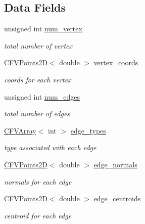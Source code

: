 \subsection*{Data Fields}
\begin{DoxyCompactItemize}
\item 
unsigned int \hyperlink{classFVL_1_1CFVMesh2D_a66b841fd6e58a9fc9b63df4fe982178f}{num\_\-vertex}
\begin{DoxyCompactList}\small\item\em total number of vertex \item\end{DoxyCompactList}\item 
\hyperlink{classFVL_1_1CFVPoints2D}{CFVPoints2D}$<$ double $>$ \hyperlink{classFVL_1_1CFVMesh2D_a87d5c74a26438af8208b9ee9fe5608d5}{vertex\_\-coords}
\begin{DoxyCompactList}\small\item\em coords for each vertex \item\end{DoxyCompactList}\item 
unsigned int \hyperlink{classFVL_1_1CFVMesh2D_ad1228ae08a3c287de40e4682e6538c12}{num\_\-edges}
\begin{DoxyCompactList}\small\item\em total number of edges \item\end{DoxyCompactList}\item 
\hyperlink{classFVL_1_1CFVArray}{CFVArray}$<$ int $>$ \hyperlink{classFVL_1_1CFVMesh2D_a8ea0de28dab4c5c3326c8b25b836b8e0}{edge\_\-types}
\begin{DoxyCompactList}\small\item\em type associated with each edge \item\end{DoxyCompactList}\item 
\hyperlink{classFVL_1_1CFVPoints2D}{CFVPoints2D}$<$ double $>$ \hyperlink{classFVL_1_1CFVMesh2D_a42a15adf693b0a6b35f542a7eebd51ed}{edge\_\-normals}
\begin{DoxyCompactList}\small\item\em normals for each edge \item\end{DoxyCompactList}\item 
\hyperlink{classFVL_1_1CFVPoints2D}{CFVPoints2D}$<$ double $>$ \hyperlink{classFVL_1_1CFVMesh2D_a3d6b698a768743ed6a78ab1603146522}{edge\_\-centroids}
\begin{DoxyCompactList}\small\item\em centroid for each edge \item\end{DoxyCompactList}\item 

\end{DoxyCompactItemize}
